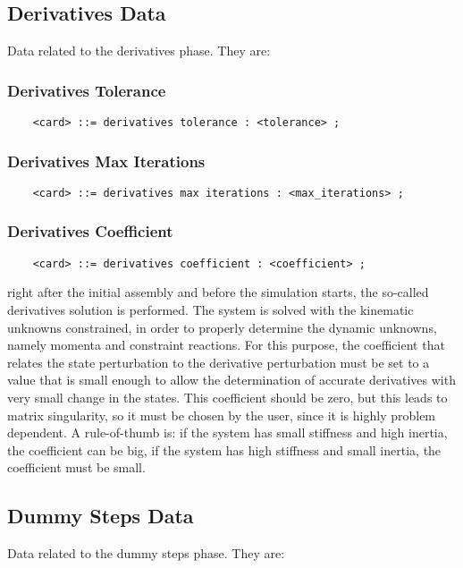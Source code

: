 \subsection{Derivatives Data}
Data related to the derivatives phase. They are:


\subsubsection{Derivatives Tolerance}
\begin{verbatim}
    <card> ::= derivatives tolerance : <tolerance> ;
\end{verbatim}

\subsubsection{Derivatives Max Iterations}
\begin{verbatim}
    <card> ::= derivatives max iterations : <max_iterations> ;
\end{verbatim}

\subsubsection{Derivatives Coefficient}
\begin{verbatim}
    <card> ::= derivatives coefficient : <coefficient> ;
\end{verbatim}
right after the initial assembly and before the simulation starts, the
so-called derivatives solution is performed. The system is solved with
the kinematic unknowns constrained, in order to properly determine the
dynamic unknowns, namely momenta and constraint reactions. For this
purpose, the coefficient that relates the state perturbation to the
derivative perturbation must be set to a value that is small enough to
allow the determination of accurate derivatives with very small change
in the states. This coefficient should be zero, but this leads to matrix
singularity, so it must be chosen by the user, since it is highly
problem dependent. A rule-of-thumb is: if the system has small
stiffness and high inertia, the coefficient can be big, if the system
has high stiffness and small inertia, the coefficient must be small.


\subsection{Dummy Steps Data}
Data related to the dummy steps phase. They are:

